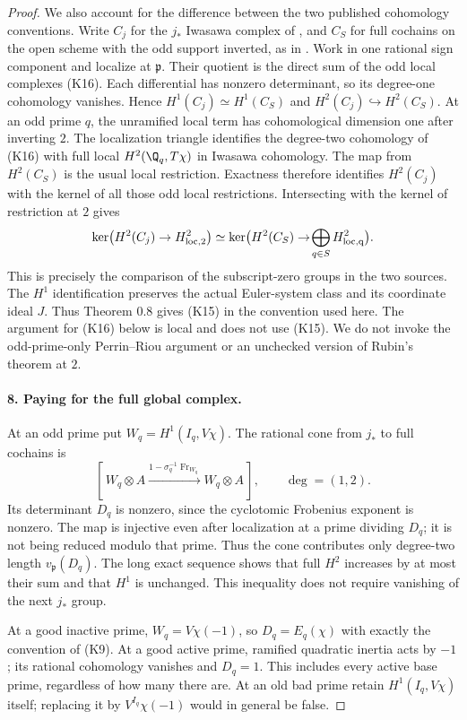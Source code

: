 \begin{proof}
We also account for the difference between the two published
cohomology conventions. Write $C_j$ for the $j_*$ Iwasawa complex of
\cite[Section 12.1]{kato}, and $C_S$ for full cochains on the open
scheme with the odd support inverted, as in \cite[Section 0.5]{kato1999}.
Work in one rational sign component and localize at $\mathfrak p$.
Their quotient is the direct sum of the odd local complexes (K16).
Each differential has nonzero determinant, so its degree-one
cohomology vanishes. Hence $H^1(C_j)\simeq H^1(C_S)$ and
$H^2(C_j)\hookrightarrow H^2(C_S)$. At an odd prime $q$, the
unramified local term has cohomological dimension one after inverting
$2$. The localization triangle identifies the degree-two cohomology
of (K16) with full local $H^2(\Q_q,T\chi)$ in Iwasawa cohomology.
The map from $H^2(C_S)$ is the usual local restriction. Exactness
therefore identifies $H^2(C_j)$ with the kernel of all those odd
local restrictions. Intersecting with the kernel of restriction at
$2$ gives
\[
 \ker\bigl(H^2(C_j)\to H^2_{\rm loc,2}\bigr)
 \simeq
 \ker\bigl(H^2(C_S)\to\!\bigoplus_{q\in S}H^2_{\rm loc,q}\bigr).
\]
This is precisely the comparison of the subscript-zero groups in
the two sources. The $H^1$ identification preserves the actual
Euler-system class and its coordinate ideal $J$. Thus Theorem 0.8
gives (K15) in the convention used here. The argument for (K16)
below is local and does not use (K15). We do not invoke the
odd-prime-only Perrin--Riou argument or an unchecked version of
Rubin's theorem at $2$.

\paragraph{8. Paying for the full global complex.}
At an odd prime put $W_q=H^1(I_q,V\chi)$. The rational cone from
$j_*$ to full cochains is
\[
 [\,W_q\otimes A\xrightarrow{1-\sigma_q^{-1}\operatorname{Fr}_{W_q}}
          W_q\otimes A\,],\qquad\deg=(1,2).              \tag{K16}
\]
Its determinant $D_q$ is nonzero, since the cyclotomic Frobenius
exponent is nonzero. The map is injective even after localization
at a prime dividing $D_q$; it is not being reduced modulo that
prime. Thus the cone contributes only degree-two length
$v_{\mathfrak p}(D_q)$. The long exact sequence shows that full
$H^2$ increases by at most their sum and that $H^1$ is unchanged.
This inequality does not require vanishing of the next $j_*$ group.

At a good inactive prime, $W_q=V\chi(-1)$, so $D_q=E_q(\chi)$
with exactly the convention of (K9). At a good active prime,
ramified quadratic inertia acts by $-1$; its rational cohomology
vanishes and $D_q=1$. This includes every active base prime,
regardless of how many there are. At an old bad prime retain
$H^1(I_q,V\chi)$ itself; replacing it by $V^{I_q}\chi(-1)$
would in general be false.


\end{proof}
